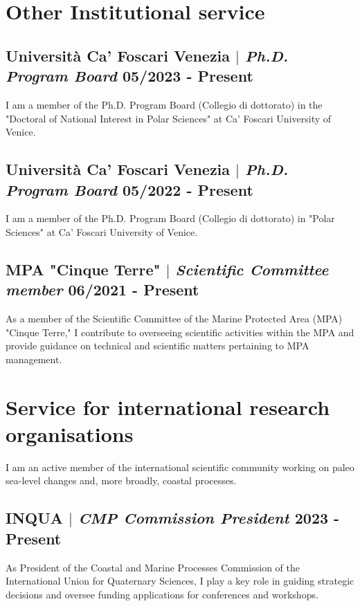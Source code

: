 \documentclass[11pt]{article}
\begin{document}
\section{Other Institutional service}
\bigskip

\subsection{Università Ca' Foscari Venezia  $|$ {\normalfont\textit{Ph.D. Program Board}} \hfill 05/2023 - Present}
{\footnotesize I am a member of the Ph.D. Program Board (Collegio di dottorato) in the "Doctoral of National Interest in Polar Sciences" at Ca' Foscari University of Venice.}
\bigskip

\subsection{Università Ca' Foscari Venezia  $|$ {\normalfont\textit{Ph.D. Program Board}} \hfill 05/2022 - Present}
{\footnotesize I am a member of the Ph.D. Program Board (Collegio di dottorato) in "Polar Sciences" at Ca' Foscari University of Venice.}
\bigskip

\subsection{MPA "Cinque Terre"  $|$ {\normalfont\textit{Scientific Committee member}} \hfill 06/2021 - Present}
{\footnotesize As a member of the Scientific Committee of the Marine Protected Area (MPA) "Cinque Terre," I contribute to overseeing scientific activities within the MPA and provide guidance on technical and scientific matters pertaining to MPA management.}
\bigskip

\newpage
\section{Service for international research organisations}
{\normalfont I am an active member of the international scientific community working on paleo sea-level changes and, more broadly, coastal processes.}\\
\bigskip
\subsection{INQUA  $|$ {\normalfont\textit{CMP Commission President}} \hfill 2023 - Present}
{\footnotesize As President of the Coastal and Marine Processes Commission of the International Union for Quaternary Sciences, I play a key role in guiding strategic decisions and oversee funding applications for conferences and workshops.}
\bigskip
\end{document}
